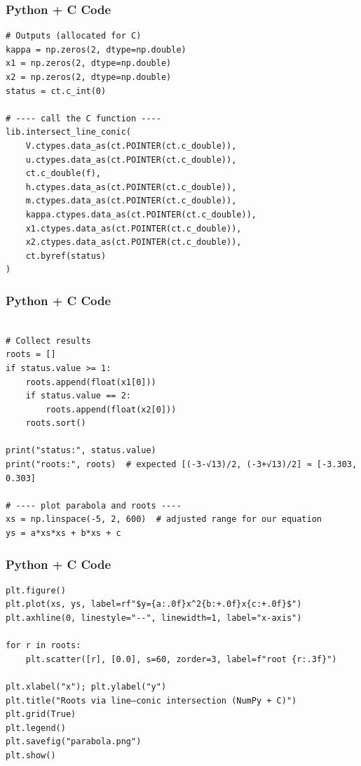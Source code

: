 \documentclass{beamer}
\numberwithin{equation}{section}
\begin{document}
\begin{frame}[fragile]
    \frametitle{Python + C Code }
    \begin{lstlisting}
# Outputs (allocated for C)
kappa = np.zeros(2, dtype=np.double)
x1 = np.zeros(2, dtype=np.double)
x2 = np.zeros(2, dtype=np.double)
status = ct.c_int(0)

# ---- call the C function ----
lib.intersect_line_conic(
    V.ctypes.data_as(ct.POINTER(ct.c_double)),
    u.ctypes.data_as(ct.POINTER(ct.c_double)),
    ct.c_double(f),
    h.ctypes.data_as(ct.POINTER(ct.c_double)),
    m.ctypes.data_as(ct.POINTER(ct.c_double)),
    kappa.ctypes.data_as(ct.POINTER(ct.c_double)),
    x1.ctypes.data_as(ct.POINTER(ct.c_double)),
    x2.ctypes.data_as(ct.POINTER(ct.c_double)),
    ct.byref(status)
)

\end{lstlisting}
\end{frame}
\begin{frame}[fragile]
    \frametitle{Python + C Code }
    \begin{lstlisting}

# Collect results
roots = []
if status.value >= 1:
    roots.append(float(x1[0]))
    if status.value == 2:
        roots.append(float(x2[0]))
    roots.sort()

print("status:", status.value)
print("roots:", roots)  # expected [(-3-√13)/2, (-3+√13)/2] ≈ [-3.303, 0.303]

# ---- plot parabola and roots ----
xs = np.linspace(-5, 2, 600)  # adjusted range for our equation
ys = a*xs*xs + b*xs + c

\end{lstlisting}
\end{frame}
\begin{frame}[fragile]
    \frametitle{Python + C Code }
    \begin{lstlisting}
plt.figure()
plt.plot(xs, ys, label=rf"$y={a:.0f}x^2{b:+.0f}x{c:+.0f}$")
plt.axhline(0, linestyle="--", linewidth=1, label="x-axis")

for r in roots:
    plt.scatter([r], [0.0], s=60, zorder=3, label=f"root {r:.3f}")

plt.xlabel("x"); plt.ylabel("y")
plt.title("Roots via line–conic intersection (NumPy + C)")
plt.grid(True)
plt.legend()
plt.savefig("parabola.png")
plt.show()
\end{lstlisting}
\end{frame}
\end{document}
